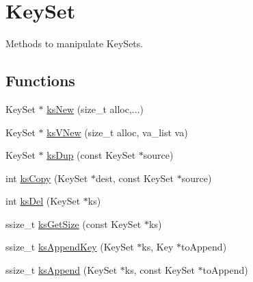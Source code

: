 \hypertarget{group__keyset}{\section{Key\-Set}
\label{group__keyset}
}


Methods to manipulate Key\-Sets.  


\subsection*{Functions}
\begin{DoxyCompactItemize}
\item 
Key\-Set $\ast$ \hyperlink{group__keyset_ga671e1aaee3ae9dc13b4834a4ddbd2c3c}{ks\-New} (size\-\_\-t alloc,...)
\item 
Key\-Set $\ast$ \hyperlink{group__keyset_ga4ff760f56693b51ab785ed7ce628e649}{ks\-V\-New} (size\-\_\-t alloc, va\-\_\-list va)
\begin{DoxyCompactList}\small\item\em \end{DoxyCompactList}\item 
Key\-Set $\ast$ \hyperlink{group__keyset_gac59e4b328245463f1451f68d5106151c}{ks\-Dup} (const Key\-Set $\ast$source)
\item 
int \hyperlink{group__keyset_gaba1f1dbea191f4d7e7eb3e4296ae7d5e}{ks\-Copy} (Key\-Set $\ast$dest, const Key\-Set $\ast$source)
\begin{DoxyCompactList}\small\item\em \end{DoxyCompactList}\item 
int \hyperlink{group__keyset_ga27e5c16473b02a422238c8d970db7ac8}{ks\-Del} (Key\-Set $\ast$ks)
\item 
ssize\-\_\-t \hyperlink{group__keyset_ga7474ad6b0a0fa969dbdf267ba5770eee}{ks\-Get\-Size} (const Key\-Set $\ast$ks)
\item 
ssize\-\_\-t \hyperlink{group__keyset_gaa5a1d467a4d71041edce68ea7748ce45}{ks\-Append\-Key} (Key\-Set $\ast$ks, Key $\ast$to\-Append)
\begin{DoxyCompactList}\small\item\em \end{DoxyCompactList}\item 
ssize\-\_\-t \hyperlink{group__keyset_ga21eb9c3a14a604ee3a8bdc779232e7b7}{ks\-Append} (Key\-Set $\ast$ks, const Key\-Set $\ast$to\-Append)
\begin{DoxyCompactList}\small\item\em \end{DoxyCompactList}\item 

\end{DoxyCompactItemize}

